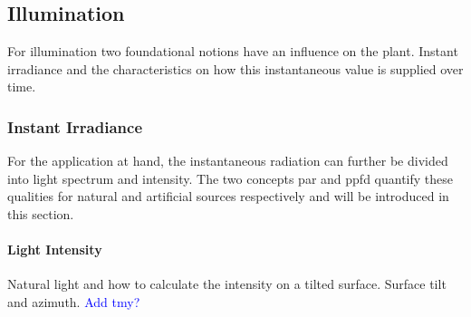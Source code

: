 



\subsection{Illumination}
For illumination two foundational notions have an influence on the plant.
Instant irradiance and the characteristics on how this instantaneous value is supplied over time.


\subsubsection{Instant Irradiance}
For the application at hand, the instantaneous radiation can further be divided into light spectrum and intensity.
The two concepts \ac{par} and \ac{ppfd} quantify these qualities for natural and artificial sources respectively and will be introduced in this section.

\paragraph{Light Intensity}
Natural light and how to calculate the intensity on a tilted surface.
Surface tilt and azimuth.
\textcolor{Blue}{Add tmy?}

